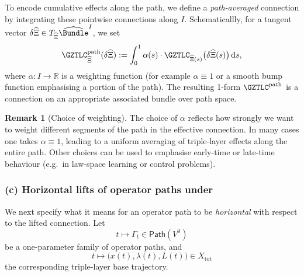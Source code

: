 \documentclass[11pt]{book}
\theoremstyle{plain}
\theoremstyle{definition}
\newtheorem{remark}[theorem]{Remark}
\begin{document}
To encode cumulative effects along the path, we define a
\emph{path-averaged} connection by integrating these pointwise
connections along $I$. Schematicallly, for a tangent vector
$\delta\widehat{\Xi}\in T_{\widehat{\Xi}}\widehat{\Bundle}^I$, we set
\[
   \GZTLC^{\mathrm{path}}_{\widehat{\Xi}}
     (\delta\widehat{\Xi})
   :=
   \int_0^1
     \alpha(s)\cdot
     \GZTLC_{\widehat{\Xi}(s)}
       \bigl(\delta\widehat{\Xi}(s)\bigr)
   \,\mathrm{d}s,
\]
where $\alpha:I\to\mathbb{R}$ is a weighting function (for example
$\alpha\equiv1$ or a smooth bump function emphasising a portion of the
path). The resulting 1-form $\GZTLC^{\mathrm{path}}$ is a connection on
an appropriate associated bundle over path space.

\begin{remark}[Choice of weighting]
The choice of $\alpha$ reflects how strongly we want to weight
  different segments of the path in the effective connection. In many
  cases one takes $\alpha\equiv 1$, leading to a uniform averaging of
  triple-layer effects along the entire path. Other choices can be used
  to emphasise early-time or late-time behaviour (e.g.\ in law-space
  learning or control problems).
\end{remark}



\subsubsection*{(c) Horizontal lifts of operator paths under \texorpdfstring{\GZTLC}{GZ-TLC}}

We next specify what it means for an operator path to be \emph{horizontal}
with respect to the lifted connection. Let
\[
   t\longmapsto\Gamma_t\in\mathsf{Path}(V^0)
\]
be a one-parameter family of operator paths, and
\[
   t\longmapsto
   \bigl(x(t),\lambda(t),L(t)\bigr)\in X_{\mathrm{tot}}
\]
the corresponding triple-layer base trajectory.
\end{document}
